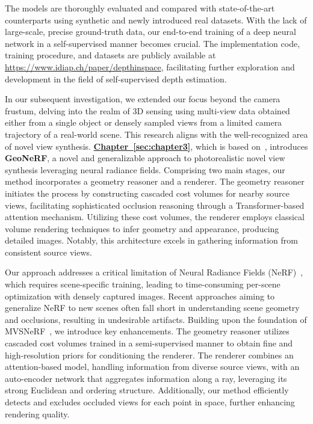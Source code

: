 The models are thoroughly evaluated and compared with state-of-the-art counterparts using synthetic and newly introduced real datasets. With the lack of large-scale, precise ground-truth data, our end-to-end training of a deep neural network in a self-supervised manner becomes crucial. The implementation code, training procedure, and datasets are publicly available at \href{https://www.idiap.ch/paper/depthinspace}{https://www.idiap.ch/paper/depthinspace}, facilitating further exploration and development in the field of self-supervised depth estimation.

In our subsequent investigation, we extended our focus beyond the camera frustum, delving into the realm of 3D sensing using multi-view data obtained either from a single object or densely sampled views from a limited camera trajectory of a real-world scene. This research aligns with the well-recognized area of novel view synthesis. \textbf{\hyperref[sec:chapter3]{Chapter~\ref{sec:chapter3}}}, which is based on~\cite{johari2022geonerf}, introduces \textbf{GeoNeRF}, a novel and generalizable approach to photorealistic novel view synthesis leveraging neural radiance fields. Comprising two main stages, our method incorporates a geometry reasoner and a renderer. The geometry reasoner initiates the process by constructing cascaded cost volumes for nearby source views, facilitating sophisticated occlusion reasoning through a Transformer-based attention mechanism. Utilizing these cost volumes, the renderer employs classical volume rendering techniques to infer geometry and appearance, producing detailed images. Notably, this architecture excels in gathering information from consistent source views.

Our approach addresses a critical limitation of Neural Radiance Fields (NeRF)~\citep{mildenhall2020nerf}, which requires scene-specific training, leading to time-consuming per-scene optimization with densely captured images. Recent approaches aiming to generalize NeRF to new scenes often fall short in understanding scene geometry and occlusions, resulting in undesirable artifacts. Building upon the foundation of MVSNeRF~\citep{chen2021mvsnerf}, we introduce key enhancements. The geometry reasoner utilizes cascaded cost volumes trained in a semi-supervised manner to obtain fine and high-resolution priors for conditioning the renderer. The renderer combines an attention-based model, handling information from diverse source views, with an auto-encoder network that aggregates information along a ray, leveraging its strong Euclidean and ordering structure. Additionally, our method efficiently detects and excludes occluded views for each point in space, further enhancing rendering quality.

